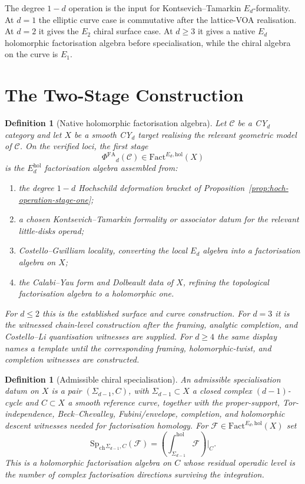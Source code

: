 \documentclass[11pt]{article}
\newtheorem{definition}[theorem]{Definition}
\providecommand{\Fact}{\mathrm{Fact}}
\providecommand{\cC}{\mathcal{C}}
\providecommand{\cF}{\mathcal{F}}
\providecommand{\PhiFA}{\Phi^{\mathrm{FA}}{}}
\providecommand{\SpCh}{\mathrm{Sp}_{\mathrm{ch}}{}}
\begin{document}
The degree $1-d$ operation is the input for Kontsevich--Tamarkin
$E_d$-formality.  At $d=1$ the elliptic curve case is commutative after
the lattice-VOA realisation.  At $d=2$ it gives the $E_2$ chiral surface
case.  At $d\geq 3$ it gives a native $E_d$ holomorphic factorisation
algebra before specialisation, while the chiral algebra on the curve is
$E_1$.

\section{The Two-Stage Construction}

\begin{definition}[Native holomorphic factorisation algebra]
\label{def:phi-fa}
Let $\cC$ be a CY$_d$ category and let $X$ be a smooth CY$_d$ target
realising the relevant geometric model of $\cC$.  On the verified loci,
the first stage
\[
 \PhiFA_d(\cC)\in \Fact^{E_d,\mathrm{hol}}(X)
\]
is the $E_d^{\mathrm{hol}}$ factorisation algebra assembled from:
\begin{enumerate}[label=\textup{(\roman*)}]
 \item the degree $1-d$ Hochschild deformation bracket of
 Proposition~\ref{prop:hoch-operation-stage-one};
 \item a chosen Kontsevich--Tamarkin formality or associator datum for
 the relevant little-disks operad;
 \item Costello--Gwilliam locality, converting the local $E_d$ algebra
 into a factorisation algebra on $X$;
 \item the Calabi--Yau form and Dolbeault data of $X$, refining the
 topological factorisation algebra to a holomorphic one.
\end{enumerate}
For $d\leq 2$ this is the established surface and curve construction.
For $d=3$ it is the witnessed chain-level construction after the
framing, analytic completion, and Costello--Li quantisation witnesses
are supplied.  For $d\geq 4$ the same display names a template until the
corresponding framing, holomorphic-twist, and completion witnesses are
constructed.
\end{definition}

\begin{definition}[Admissible chiral specialisation]
\label{def:sp-ch}
An \emph{admissible specialisation datum} on $X$ is a pair
$(\Sigma_{d-1},C)$, with $\Sigma_{d-1}\subset X$ a closed complex
$(d-1)$-cycle and $C\subset X$ a smooth reference curve, together with
the proper-support, Tor-independence, Beck--Chevalley, Fubini/envelope,
completion, and holomorphic descent witnesses needed for factorisation
homology.  For $\cF\in\Fact^{E_d,\mathrm{hol}}(X)$ set
\[
 \SpCh_{\Sigma_{d-1},C}(\cF)
 =
 \left(\int_{\Sigma_{d-1}}^{\mathrm{hol}}\cF\right)\bigg|_C .
\]
This is a holomorphic factorisation algebra on $C$ whose residual
operadic level is the number of complex factorisation directions
surviving the integration.
\end{definition}
\end{document}
